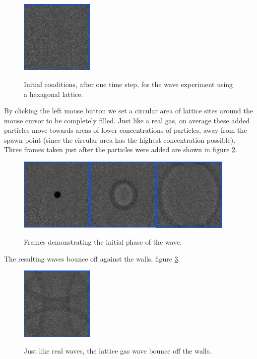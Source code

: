 \documentclass[12pt,a4paper]{article}
\begin{document}
\begin{figure}[htp]
\centering
  \includegraphics[width=100pt]{figs/hexwaveinit.png}
\label{hexwaveinit}
\caption{Initial conditions, after one time step, for the wave experiment using a hexagonal lattice.}
\end{figure}

By clicking the left mouse button we set a circular area of lattice sites around the mouse cursor to
be completely filled. Just like a real gas, on average these added particles move towards areas of lower
concentrations of particles, away from the spawn point (since the circular area has the highest concentration
possible). Three frames taken just after the particles were added are shown in figure \ref{hexwavestart}.

\begin{figure}[htp]
\centering
  \includegraphics[width=300pt]{figs/hexwavestart.png}
\label{hexwavestart}
\caption{Frames demonstrating the initial phase of the wave.}
\end{figure}


The resulting waves bounce off against the walls, figure \ref{hexwavebounce}.
\begin{figure}[htp]
\centering
  \includegraphics[width=100pt]{figs/hexwavebounce.png}
\label{hexwavebounce}
\caption{Just like real waves, the lattice gas wave bounce off the walls.}
\end{figure}
\end{document}
